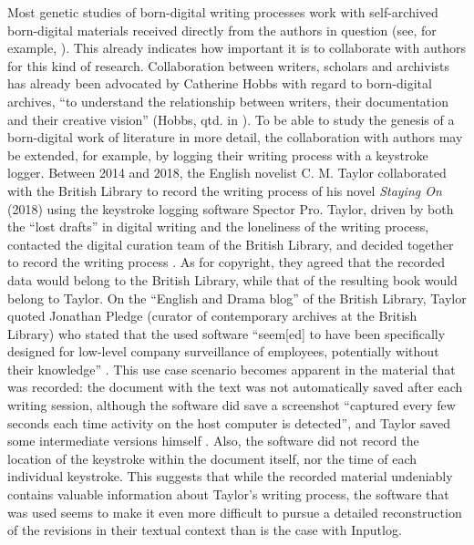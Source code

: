 \begin{paper}
Most genetic studies of born-digital writing processes work with self-archived born-digital materials
received directly from the authors in question (see, for example, \citealt{vauthier_genetic_2016,crombez_postdramatic_2017,vasari_securing_2019}). This already indicates how important it is to collaborate with authors for this kind of research. Collaboration between writers, scholars and
archivists has already been advocated by Catherine Hobbs with regard to
born-digital archives, ``to understand the relationship between writers,
their documentation and their creative vision'' (Hobbs, qtd. in
\citealt[384]{gooding_forensic_2019}). To be able to study the genesis of a
born-digital work of literature in more detail, the collaboration with
authors may be extended, for example, by logging their writing process
with a keystroke logger. Between 2014 and 2018, the English novelist C.
M. Taylor collaborated with the British Library to record the writing
process of his novel \emph{Staying On} (2018) using the keystroke
logging software Spector Pro. Taylor, driven by both the ``lost drafts'' in
digital writing and the loneliness of the writing process, contacted the
digital curation team of the British Library, and decided together
to record the writing process \citep[n.p.]{taylor_c_2018}. As for copyright, they agreed that the recorded data would belong
to the British Library, while that of the resulting book would belong to Taylor. On the ``English and Drama blog'' of the British Library, Taylor
quoted Jonathan Pledge (curator of contemporary archives at the
British Library) who stated that the used software ``seem[ed] to have
been specifically designed for low-level company surveillance of
employees, potentially without their knowledge'' \citep[n.p.]{taylor_c_2018}.
This use case scenario becomes apparent in the material that was
recorded: the document with the text was not automatically saved after
each writing session, although the software did save a screenshot
``captured every few seconds each time activity on the host computer is
detected'', and Taylor saved some intermediate versions himself
\citep[n.p.]{taylor_c_2018}. Also, the software did not record the location of
the keystroke within the document itself, nor the time of each
individual keystroke. This suggests that while the recorded material
undeniably contains valuable information about Taylor's writing process,
the software that was used seems to make it even more difficult to
pursue a detailed reconstruction of the revisions in their textual
context than is the case with Inputlog.


\end{paper}
